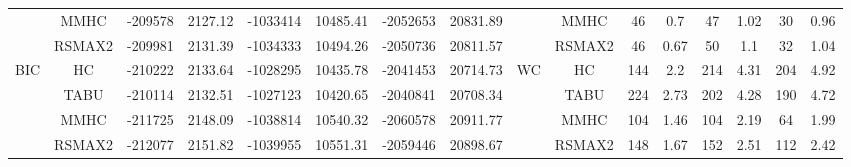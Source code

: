 \begin{table}[p]
{\begin{tabular}{cc||cc|cc|cc||cc|cc|cc|cc}
& MMHC &	-209578 & 	2127.12 & 	-1033414 & 	10485.41 & 	-2052653 & 	20831.89 & 	& MMHC &	46 & 	0.7 & 	47 & 	1.02 & 	30 & 	0.96\tabularnewline													
& RSMAX2 &	-209981 & 	2131.39 & 	-1034333 & 	10494.26 & 	-2050736 & 	20811.57 & 	& RSMAX2 &	46 & 	0.67 & 	50 & 	1.1 & 	32 & 	1.04\tabularnewline													
\hline																										
\multirow{4}{*}{BIC} & HC &	-210222 & 	2133.64 & 	-1028295 & 	10435.78 & 	-2041453 & 	20714.73 & 	\multirow{4}{*}{WC} & HC &	144 & 	2.2 & 	214 & 	4.31 & 	204 & 	4.92\tabularnewline													
& TABU &	-210114 & 	2132.51 & 	-1027123 & 	10420.65 & 	-2040841 & 	20708.34 & 	& TABU &	224 & 	2.73 & 	202 & 	4.28 & 	190 & 	4.72\tabularnewline													
& MMHC &	-211725 & 	2148.09 & 	-1038814 & 	10540.32 & 	-2060578 & 	20911.77 & 	& MMHC &	104 & 	1.46 & 	104 & 	2.19 & 	64 & 	1.99\tabularnewline													
& RSMAX2 &	-212077 & 	2151.82 & 	-1039955 & 	10551.31 & 	-2059446 & 	20898.67 & 	& RSMAX2 &	148 & 	1.67 & 	152 & 	2.51 & 	112 & 	2.42\tabularnewline													
\hline																										
\end{tabular}																										
}																										
\end{table}																										



